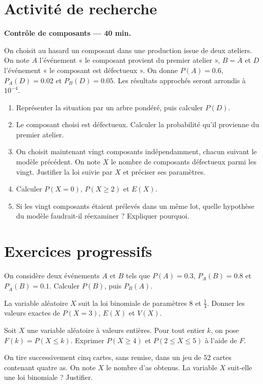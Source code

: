 \section{Activité de recherche}\textbf{Contrôle de composants --- 40 min.}\par On choisit au hasard un composant dans une production issue de deux ateliers. On note $A$ l'événement « le composant provient du premier atelier », $B=\overline A$ et $D$ l'événement « le composant est défectueux ». On donne $P(A)=\num{0,6}$, $P_A(D)=\num{0,02}$ et $P_B(D)=\num{0,05}$. Les résultats approchés seront arrondis à $10^{-4}$.
\begin{enumerate}\item Représenter la situation par un arbre pondéré, puis calculer $P(D)$.
\item Le composant choisi est défectueux. Calculer la probabilité qu'il provienne du premier atelier.
\item On choisit maintenant vingt composants indépendamment, chacun suivant le modèle précédent. On note $X$ le nombre de composants défectueux parmi les vingt. Justifier la loi suivie par $X$ et préciser ses paramètres.
\item Calculer $P(X=0)$, $P(X\ge2)$ et $E(X)$.
\item Si les vingt composants étaient prélevés dans un même lot, quelle hypothèse du modèle faudrait-il réexaminer ? Expliquer pourquoi.\end{enumerate}

\mxnewpage
\section{Exercices progressifs}

On considère deux événements $A$ et $B$ tels que $P(A)=\num{0,3}$, $P_A(B)=\num{0,8}$ et $P_{\overline A}(B)=\num{0,1}$. Calculer $P(B)$, puis $P_B(A)$.

La variable aléatoire $X$ suit la loi binomiale de paramètres $8$ et $\frac14$. Donner les valeurs exactes de $P(X=3)$, $E(X)$ et $V(X)$.

Soit $X$ une variable aléatoire à valeurs entières. Pour tout entier $k$, on pose $F(k)=P(X\le k)$. Exprimer $P(X\ge4)$ et $P(2\le X\le5)$ à l'aide de $F$.

On tire successivement cinq cartes, sans remise, dans un jeu de 52 cartes contenant quatre as. On note $X$ le nombre d'as obtenus. La variable $X$ suit-elle une loi binomiale ? Justifier.

